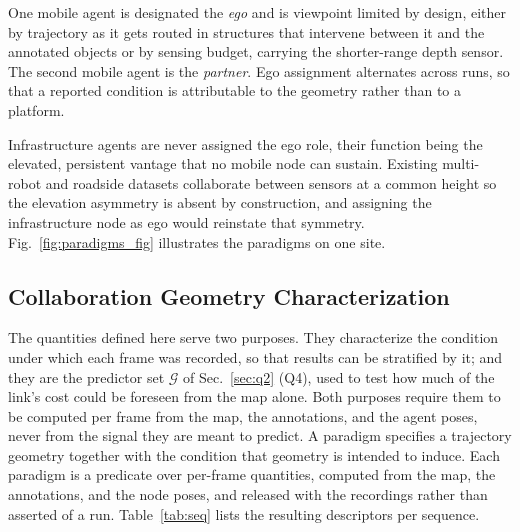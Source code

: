\documentclass[journal]{IEEEtran}
\begin{document}
One mobile agent is designated the \textit{ego} and is viewpoint
limited by design, either by trajectory as it gets routed in
structures that intervene between it and the annotated objects or by
sensing budget, carrying the shorter-range depth sensor. The second
mobile agent is the \textit{partner}. Ego assignment alternates across
runs, so that a reported condition is attributable to the geometry
rather than to a platform.

Infrastructure agents are never assigned the ego role, their function
being the elevated, persistent vantage that no mobile node can
sustain. Existing multi-robot and roadside datasets collaborate
between sensors at a common height \cite{s3e,inscope} so the elevation
asymmetry is absent by construction, and assigning the infrastructure
node as ego would reinstate that symmetry. Fig.~\ref{fig:paradigms_fig}
illustrates the paradigms on one site.



\subsection{Collaboration Geometry Characterization}
\label{sec:paradigms}



The quantities defined here serve two purposes. They characterize the
condition under which each frame was recorded, so that results can be
stratified by it; and they are the predictor set $\mathcal{G}$ of
Sec.~\ref{sec:q2} (Q4), used to test how much of the link's cost could
be foreseen from the map alone. Both purposes require them to be
computed per frame from the map, the annotations, and the agent poses,
never from the signal they are meant to predict. A paradigm specifies
a trajectory geometry together with the condition that geometry is
intended to induce. Each paradigm is a predicate over per-frame
quantities, computed from the map, the annotations, and the node
poses, and released with the recordings rather than asserted of a run.
Table~\ref{tab:seq} lists the resulting descriptors per sequence.
\end{document}
